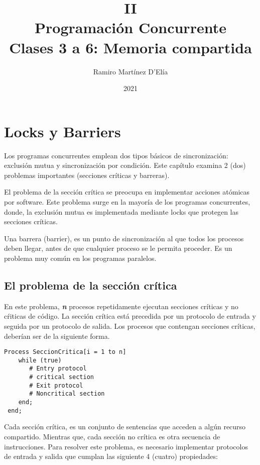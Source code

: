 \documentclass[a4paper, 11pt]{book}
\begin{document}
\title{
    II\\
    Programación Concurrente\\
    \large Clases 3 a 6: Memoria compartida
}
\author{Ramiro Martínez D'Elía}
\date{2021}
\maketitle
\newpage

\tableofcontents
\newpage

\chapter{Locks y Barriers}

Los programas concurrentes emplean dos tipos básicos de sincronización: exclusión mutua y sincronización por condición. Este capítulo examina 2 (dos) problemas importantes (secciones críticas y barreras).

El problema de la sección crítica se preocupa en implementar acciones atómicas por software. Este problema surge en la mayoría de los programas concurrentes, donde, la exclusión mutua es implementada mediante locks que protegen las secciones críticas.

Una barrera (barrier), es un punto de sincronización al que todos los procesos deben llegar, antes de que cualquier proceso se le permita proceder. Es un problema muy común en los programas paralelos.

\section{El problema de la sección crítica}

En este problema, \textbf{\emph{n}} procesos repetidamente ejecutan secciones críticas y no cŕiticas de código. La sección crítica está precedida por un protocolo de entrada y seguida por un protocolo de salida. Los procesos que contengan secciones críticas, deberían ser de la siguiente forma.

\begin{lstlisting}
Process SeccionCritica[i = 1 to n]
    while (true)
       # Entry protocol
       # critical section
       # Exit protocol
       # Noncritical section
    end;
 end;
\end{lstlisting}

Cada sección crítica, es un conjunto de sentencias que acceden a algún recurso compartido. Mientras que, cada sección no crítica es otra secuencia de instrucciones. Para resolver este problema, es necesario implementar protocolos de entrada y salida que cumplan las siguiente 4 (cuatro) propiedades:
\end{document}
